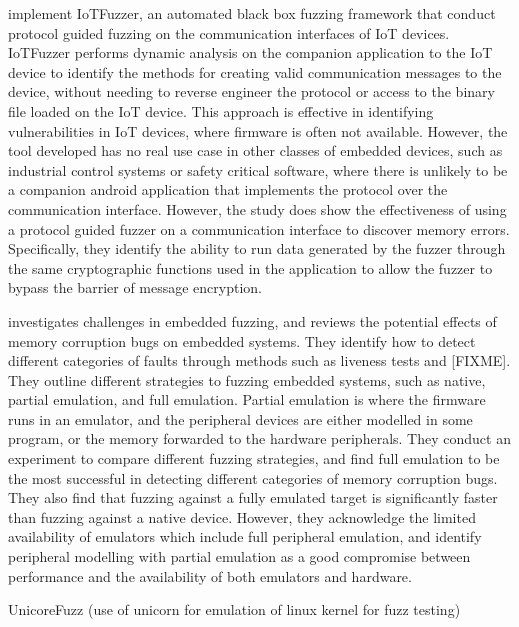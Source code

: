 \documentclass[../report.tex]{subfiles}
\begin{document}
\citet{IOTFuzzer_2018} implement IoTFuzzer, an automated black box fuzzing
framework that conduct protocol guided fuzzing on the communication interfaces
of IoT devices. IoTFuzzer performs dynamic analysis on the companion
application to the IoT device to identify the methods for creating valid
communication messages to the device, without needing to reverse engineer the
protocol or access to the binary file loaded on the IoT device. This approach
is effective in identifying vulnerabilities in IoT devices, where firmware is
often not available. However, the tool developed has no real use case in other
classes of embedded devices, such as industrial control systems or safety
critical software, where there is unlikely to be a companion android
application that implements the protocol over the communication interface.
However, the study does show the effectiveness of using a protocol guided
fuzzer on a communication interface to discover memory errors. Specifically,
they identify the ability to run data generated by the fuzzer through the same
cryptographic functions used in the application to allow the fuzzer to bypass
the barrier of message encryption.

\citet{Muench_2018} investigates challenges in embedded fuzzing, and reviews
the potential effects of memory corruption bugs on embedded systems.
They identify how to detect different categories of faults through methods such
as liveness tests and [FIXME]. They outline different strategies to fuzzing embedded
systems, such as native, partial emulation, and full emulation. Partial
emulation is where the firmware runs in an emulator, and the peripheral devices
are either modelled in some program, or the memory forwarded to the hardware
peripherals. They conduct an experiment to compare different fuzzing
strategies, and find full emulation to be the most successful in detecting
different categories of memory corruption bugs. They also find that fuzzing
against a fully emulated target is significantly faster than fuzzing against a
native device. However, they acknowledge the limited availability of emulators
which include full peripheral emulation, and identify peripheral modelling with
partial emulation as a good compromise between performance and the availability of
both emulators and hardware.

\citet{Maier_2019} UnicoreFuzz (use of unicorn for emulation of linux kernel for fuzz testing)
\end{document}
